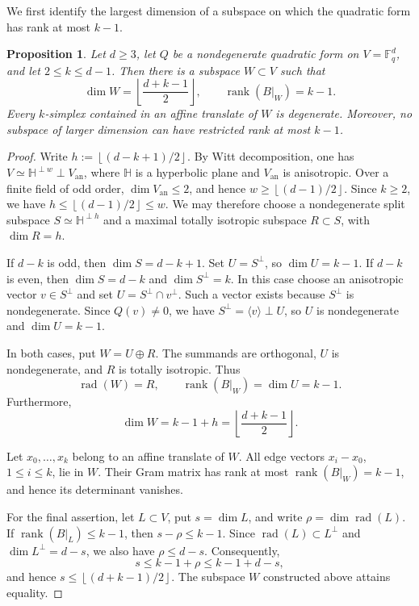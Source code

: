 \documentclass[11pt]{article}
\newtheorem{proposition}[theorem]{Proposition}
\theoremstyle{remark}
\numberwithin{equation}{section}
\newcommand{\Fq}{\mathbb F_q}
\newcommand{\rank}{\operatorname{rank}}
\newcommand{\rad}{\operatorname{rad}}
\newcommand{\1}{\mathbf 1}
\begin{document}
We first identify the largest dimension of a subspace on which the
quadratic form has rank at most \(k-1\).

\begin{proposition}\label{prop:sharpness}
Let \(d\ge3\), let \(Q\) be a nondegenerate quadratic form on
\(V=\Fq^d\), and let \(2\le k\le d-1\). Then there is a subspace
\(W\subset V\) such that
\[
 \dim W=\left\lfloor\frac{d+k-1}{2}\right\rfloor,
 \qquad
 \rank(B|_W)=k-1.
\]
Every \(k\)-simplex contained in an affine translate of \(W\) is
degenerate. Moreover, no subspace of larger dimension can have
restricted rank at most \(k-1\).
\end{proposition}

\begin{proof}
Write $h:=\left\lfloor (d-k+1)/2\right\rfloor$. By Witt decomposition, one has $V\simeq \mathbb H^{\perp w}\perp V_{\mathrm{an}}$, where \(\mathbb H\) is a hyperbolic plane and \(V_{\mathrm{an}}\) is anisotropic. Over a finite field of odd order, \(\dim V_{\mathrm{an}}\le2\), and hence $w\ge\left\lfloor (d-1)/2\right\rfloor$. Since \(k\ge2\), we have $h\le\left\lfloor (d-1)/2\right\rfloor\le w$. We may therefore choose a nondegenerate split subspace \(S\simeq\mathbb H^{\perp h}\) and a maximal totally isotropic subspace \(R\subset S\), with \(\dim R=h\).

If \(d-k\) is odd, then \(\dim S=d-k+1\). Set \(U=S^\perp\), so \(\dim U=k-1\). If \(d-k\) is even, then \(\dim S=d-k\) and \(\dim S^\perp=k\). In this case choose an anisotropic vector \(v\in S^\perp\) and set $U=S^\perp\cap v^\perp$. Such a vector exists because \(S^\perp\) is nondegenerate. Since
\(Q(v)\ne0\), we have $S^\perp=\langle v\rangle\perp U$, so \(U\) is nondegenerate and \(\dim U=k-1\).

In both cases, put \(W=U\oplus R\). The summands are orthogonal,
\(U\) is nondegenerate, and \(R\) is totally isotropic. Thus
\[
        \rad(W)=R,
        \qquad
        \rank(B|_W)=\dim U=k-1.
\]
Furthermore,
\[
 \dim W=k-1+h
 =\left\lfloor\frac{d+k-1}{2}\right\rfloor.
\]

Let \(x_0,\ldots,x_k\) belong to an affine translate of \(W\). All
edge vectors \(x_i-x_0\), \(1\le i\le k\), lie in \(W\). Their Gram
matrix has rank at most \(\rank(B|_W)=k-1\), and hence its determinant
vanishes.

For the final assertion, let \(L\subset V\), put \(s=\dim L\), and
write \(\rho=\dim\rad(L)\). If \(\rank(B|_L)\le k-1\), then $s-\rho\le k-1$. Since \(\rad(L)\subset L^\perp\) and \(\dim L^\perp=d-s\), we also have \(\rho\le d-s\). Consequently,
\[
        s\le k-1+\rho\le k-1+d-s,
\]
and hence $s\le\left\lfloor (d+k-1)/2\right\rfloor$. The subspace \(W\) constructed above attains equality.
\end{proof}
\end{document}
